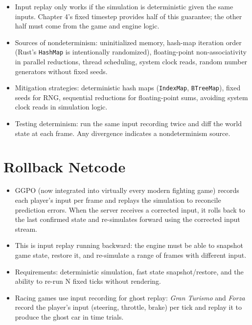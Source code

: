 \documentclass[
  11pt,
  letterpaper,
  DIV=11,
  numbers=noendperiod,
  twoside,
  open=right]{scrreprt}
\providecommand{\tightlist}{%
  \setlength{\itemsep}{0pt}\setlength{\parskip}{0pt}}
\begin{document}
\begin{itemize}
\tightlist
\item
  Input replay only works if the simulation is deterministic given the
  same inputs. Chapter 4's fixed timestep provides half of this
  guarantee; the other half must come from the game and engine logic.
\item
  Sources of nondeterminism: uninitialized memory, hash-map iteration
  order (Rust's \texttt{HashMap} is intentionally randomized),
  floating-point non-associativity in parallel reductions, thread
  scheduling, system clock reads, random number generators without fixed
  seeds.
\item
  Mitigation strategies: deterministic hash maps (\texttt{IndexMap},
  \texttt{BTreeMap}), fixed seeds for RNG, sequential reductions for
  floating-point sums, avoiding system clock reads in simulation logic.
\item
  Testing determinism: run the same input recording twice and diff the
  world state at each frame. Any divergence indicates a nondeterminism
  source.
\end{itemize}

\section{Rollback Netcode}\label{rollback-netcode}

\begin{itemize}
\tightlist
\item
  GGPO (now integrated into virtually every modern fighting game)
  records each player's input per frame and replays the simulation to
  reconcile prediction errors. When the server receives a corrected
  input, it rolls back to the last confirmed state and re-simulates
  forward using the corrected input stream.
\item
  This is input replay running backward: the engine must be able to
  snapshot game state, restore it, and re-simulate a range of frames
  with different input.
\item
  Requirements: deterministic simulation, fast state snapshot/restore,
  and the ability to re-run N fixed ticks without rendering.
\item
  Racing games use input recording for ghost replay: \emph{Gran Turismo}
  and \emph{Forza} record the player's input (steering, throttle, brake)
  per tick and replay it to produce the ghost car in time trials.
\end{itemize}
\end{document}
